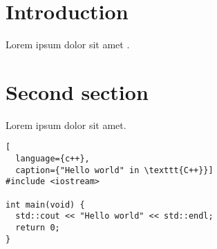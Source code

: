 \section{Introduction}
Lorem ipsum dolor sit amet \cite{smit54}.

\newpage
\section{Second section}
Lorem ipsum dolor sit amet.
\begin{lstlisting}[
  language={c++}, 
  caption={"Hello world" in \texttt{C++}}]
#include <iostream>

int main(void) {
  std::cout << "Hello world" << std::endl;
  return 0;
}
\end{lstlisting}
